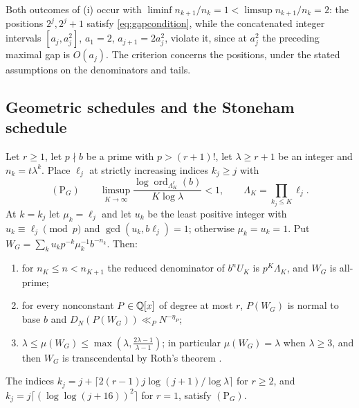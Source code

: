 \documentclass[11pt]{article}
\DeclareMathOperator{\ord}{ord}
\begin{document}
Both outcomes of (i) occur with $\liminf n_{k+1}/n_k=1<\limsup n_{k+1}/n_k=2$: the positions $2^j,2^j+1$ satisfy
\eqref{eq:gapcondition}, while the concatenated integer intervals $[a_j,a_j^2]$, $a_1=2$, $a_{j+1}=2a_j^2$, violate it, since at
$a_j^2$ the preceding maximal gap is $O(a_j)$. The criterion concerns the positions, under the stated assumptions on the
denominators and tails.

\subsection{Geometric schedules and the Stoneham schedule}

\begin{theorem}\label{thm:geometric}
Let $r\ge1$, let $p\nmid b$ be a prime with $p>(r+1)!$, let $\lambda\ge r+1$ be an integer and $n_k=t\lambda^k$. Place $\ell_j$ at strictly
increasing indices $k_j\ge j$ with
\[
(\mathrm P_G)\qquad\limsup_{K\to\infty}\frac{\log\ord_{\Lambda_K^r}(b)}{K\log\lambda}<1,\qquad\Lambda_K=\prod_{k_j\le K}\ell_j .
\]
At $k=k_j$ let $\mu_k=\ell_j$ and let $u_k$ be the least positive integer with $u_k\equiv\ell_j\pmod p$ and $\gcd(u_k,b\ell_j)=1$; otherwise
$\mu_k=u_k=1$. Put $W_G=\sum_ku_kp^{-k}\mu_k^{-1}b^{-n_k}$. Then:
\begin{enumerate}[label=\textup{(\roman*)},nosep]
\item for $n_K\le n<n_{K+1}$ the reduced denominator of $b^nU_K$ is $p^K\Lambda_K$, and $W_G$ is all-prime;
\item for every nonconstant $P\in\mathbb Q[x]$ of degree at most $r$, $P(W_G)$ is normal to base $b$ and $D_N(P(W_G))\ll_PN^{-\eta_P}$;
\item $\lambda\le\mu(W_G)\le\max(\lambda,\frac{2\lambda-1}{\lambda-1})$; in particular $\mu(W_G)=\lambda$ when $\lambda\ge3$, and then $W_G$ is transcendental by
Roth's theorem \cite{Roth55}.
\end{enumerate}
The indices $k_j=j+\lceil2(r-1)j\log(j+1)/\log\lambda\rceil$ for $r\ge2$, and $k_j=j\lceil(\log\log(j+16))^2\rceil$ for $r=1$, satisfy
$(\mathrm P_G)$.
\end{theorem}
\end{document}
